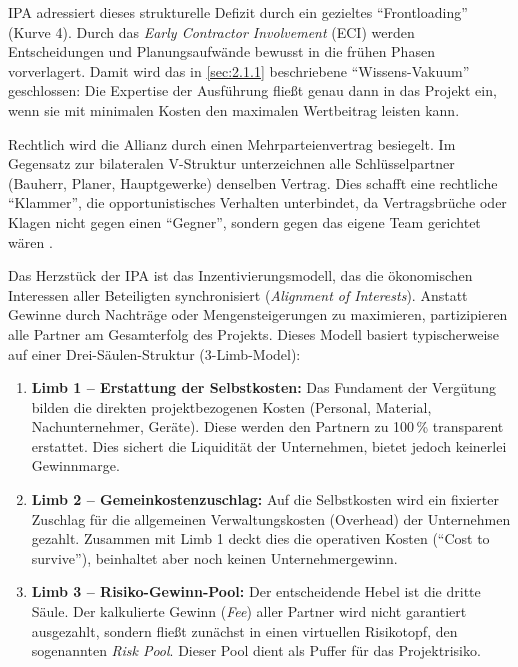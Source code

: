 \acs{IPA} adressiert dieses strukturelle Defizit durch ein gezieltes \enquote{Frontloading} (Kurve 4). Durch das \textit{Early Contractor Involvement} (\acs{ECI}) werden Entscheidungen und Planungsaufwände bewusst in die frühen Phasen vorverlagert. Damit wird das in \cref{sec:2.1.1} beschriebene \enquote{Wissens-Vakuum} geschlossen: Die Expertise der Ausführung fließt genau dann in das Projekt ein, wenn sie mit minimalen Kosten den maximalen Wertbeitrag leisten kann. \autocite[Vgl.][S.~4]{curt_collaboration_2004}

Rechtlich wird die Allianz durch einen Mehrparteienvertrag besiegelt. Im Gegensatz zur bilateralen V-Struktur unterzeichnen alle Schlüsselpartner (Bauherr, Planer, Hauptgewerke) denselben Vertrag. Dies schafft eine rechtliche \enquote{Klammer}, die opportunistisches Verhalten unterbindet, da Vertragsbrüche oder Klagen nicht gegen einen \enquote{Gegner}, sondern gegen das eigene Team gerichtet wären \autocite[Vgl.][S.~5]{bold_integrierte_2022}.

Das Herzstück der \ac{IPA} ist das Inzentivierungsmodell, das die ökonomischen Interessen aller Beteiligten synchronisiert (\textit{Alignment of Interests}). Anstatt Gewinne durch Nachträge oder Mengensteigerungen zu maximieren, partizipieren alle Partner am Gesamterfolg des Projekts. Dieses Modell basiert typischerweise auf einer Drei-Säulen-Struktur (3-Limb-Model): \autocite[Vgl.][S.~33 ff]{becker_integrierte_2022}

\begin{enumerate}
    \item \textbf{Limb 1 -- Erstattung der Selbstkosten:} Das Fundament der Vergütung bilden die direkten projektbezogenen Kosten (Personal, Material, Nachunternehmer, Geräte). Diese werden den Partnern zu 100\,\% transparent erstattet. Dies sichert die Liquidität der Unternehmen, bietet jedoch keinerlei Gewinnmarge.
    
    \item \textbf{Limb 2 -- Gemeinkostenzuschlag:} Auf die Selbstkosten wird ein fixierter Zuschlag für die allgemeinen Verwaltungskosten (Overhead) der Unternehmen gezahlt. Zusammen mit Limb 1 deckt dies die operativen Kosten (\enquote{Cost to survive}), beinhaltet aber noch keinen Unternehmergewinn.
    
    \item \textbf{Limb 3 -- Risiko-Gewinn-Pool:} Der entscheidende Hebel ist die dritte Säule. Der kalkulierte Gewinn (\textit{Fee}) aller Partner wird nicht garantiert ausgezahlt, sondern fließt zunächst in einen virtuellen Risikotopf, den sogenannten \textit{Risk Pool}. Dieser Pool dient als Puffer für das Projektrisiko.
\end{enumerate}

